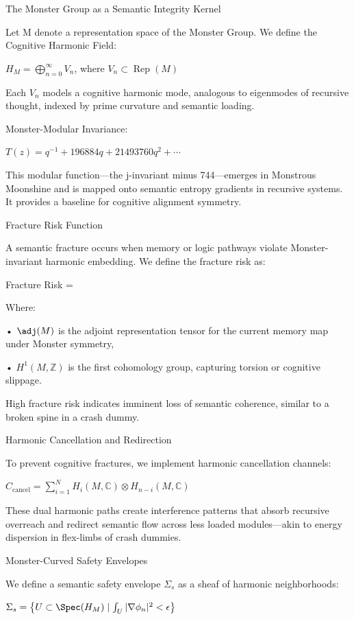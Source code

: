 \documentclass[11pt]{article}
\begin{document}
The Monster Group as a Semantic Integrity Kernel

Let M denote a representation space of the Monster Group. We define the Cognitive Harmonic Field:

$H_M = \bigoplus_{n=0}^\infty V_n$, where $V_n \subset \operatorname{Rep}(M)$

Each $V_n$ models a cognitive harmonic mode, analogous to eigenmodes of recursive thought, indexed by prime curvature and semantic loading.

Monster-Modular Invariance:

$T(z) = q^{-1} + 196884q + 21493760q^2 + \cdots$

This modular function—the j-invariant minus 744—emerges in Monstrous Moonshine and is mapped onto semantic entropy gradients in recursive systems. It provides a baseline for cognitive alignment symmetry.

Fracture Risk Function

A semantic fracture occurs when memory or logic pathways violate Monster-invariant harmonic embedding. We define the fracture risk as:

Fracture Risk = 

Where:

• $\adj(M)$ is the adjoint representation tensor for the current memory map under Monster symmetry,

• $H^1(M, \mathbb{Z})$ is the first cohomology group, capturing torsion or cognitive slippage.

High fracture risk indicates imminent loss of semantic coherence, similar to a broken spine in a crash dummy.

Harmonic Cancellation and Redirection

To prevent cognitive fractures, we implement harmonic cancellation channels:

$C_{\text{cancel}} = \sum_{i=1}^N H_i(M, \mathbb{C}) \otimes H_{n-i}(M, \mathbb{C})$

These dual harmonic paths create interference patterns that absorb recursive overreach and redirect semantic flow across less loaded modules—akin to energy dispersion in flex-limbs of crash dummies.

Monster-Curved Safety Envelopes

We define a semantic safety envelope $\Sigma_s$ as a sheaf of harmonic neighborhoods:

$\Sigma_s = \left\{ U \subset \Spec(H_M) \mid \int_U |\nabla \phi_n|^2 < \epsilon \right\}$
\end{document}
